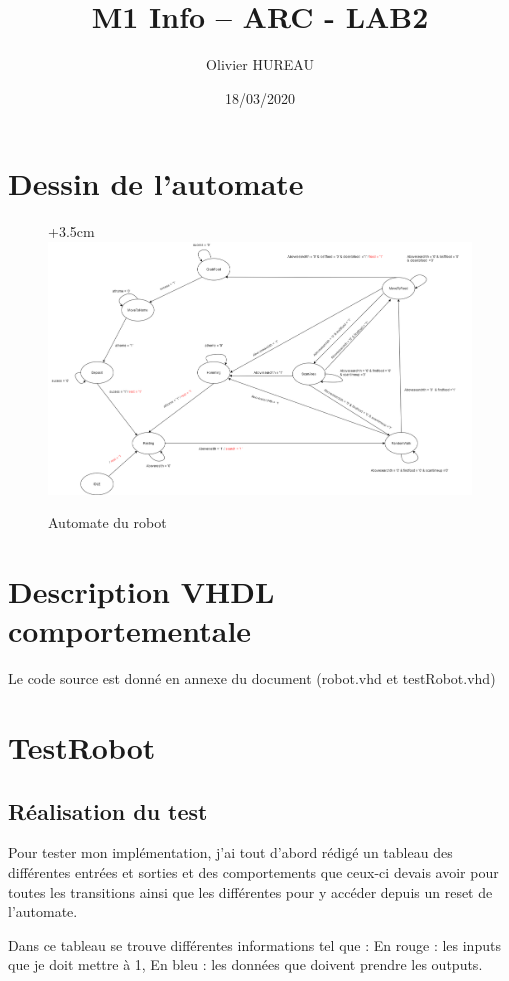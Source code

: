 \documentclass{article}
\title{M1 Info – ARC - LAB2}
\author{Olivier HUREAU }
\date{18/03/2020}
\begin{document}
\maketitle

\section{Dessin de l'automate}

\begin{figure}[!h]
\advance\leftskip+3.5cm
\includegraphics[scale=0.36, angle=-90]{Automate.png}
\caption{Automate du robot}
\end{figure}

\newpage
\section{Description VHDL comportementale}
Le code source est donné en annexe du document (robot.vhd et testRobot.vhd)

\section{TestRobot}
\subsection{Réalisation du test}
Pour tester mon implémentation, j'ai tout d'abord rédigé un tableau des différentes entrées et sorties et des comportements que ceux-ci devais avoir pour toutes les transitions ainsi que les différentes pour y accéder depuis un reset de l'automate.

Dans ce tableau se trouve différentes informations tel que : En rouge :  les inputs que je doit mettre à 1, En bleu : les données que doivent prendre les outputs. 
\end{document}
